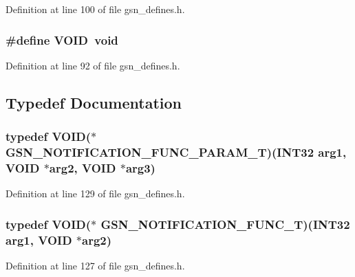 Definition at line 100 of file gsn\_\-defines.h.

\hypertarget{a00481_a7f319bfc2492a2136964194204e7a8cf}{
\subsubsection[{VOID}]{\setlength{\rightskip}{0pt plus 5cm}\#define VOID~void}}
\label{a00481_a7f319bfc2492a2136964194204e7a8cf}


Definition at line 92 of file gsn\_\-defines.h.



\subsection{Typedef Documentation}
\hypertarget{a00481_ade5de35fdb0758ec8628e62ed56bc533}{
\subsubsection[{GSN\_\-NOTIFICATION\_\-FUNC\_\-PARAM\_\-T}]{\setlength{\rightskip}{0pt plus 5cm}typedef VOID($\ast$  {\bf GSN\_\-NOTIFICATION\_\-FUNC\_\-PARAM\_\-T})({\bf INT32} arg1, VOID $\ast$arg2, VOID $\ast$arg3)}}
\label{a00481_ade5de35fdb0758ec8628e62ed56bc533}


Definition at line 129 of file gsn\_\-defines.h.

\hypertarget{a00481_aac7371fae4e423f90332caf551b62cf1}{
\subsubsection[{GSN\_\-NOTIFICATION\_\-FUNC\_\-T}]{\setlength{\rightskip}{0pt plus 5cm}typedef VOID($\ast$  {\bf GSN\_\-NOTIFICATION\_\-FUNC\_\-T})({\bf INT32} arg1, VOID $\ast$arg2)}}
\label{a00481_aac7371fae4e423f90332caf551b62cf1}


Definition at line 127 of file gsn\_\-defines.h.

